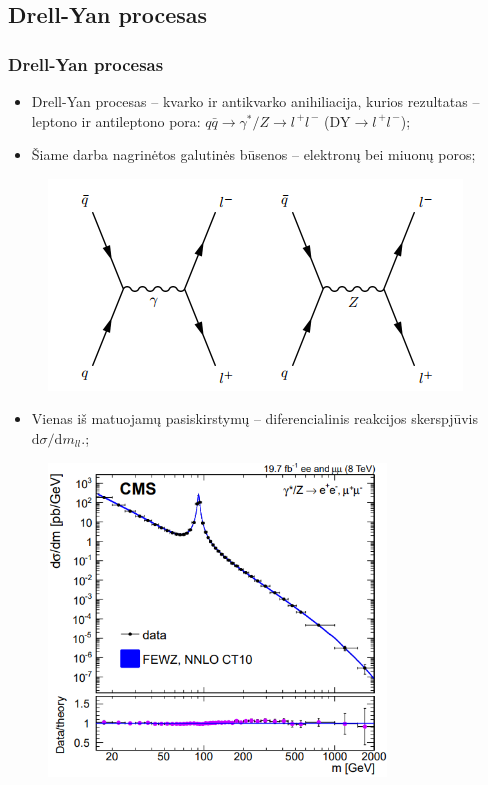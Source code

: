 \documentclass[xcolor=dvipsnames]{beamer}
\begin{document}
\begin{frame}
	\section{Drell-Yan procesas}
	\frametitle{Drell-Yan procesas}
	\begin{itemize}
		\item Drell-Yan procesas -- kvarko ir antikvarko anihiliacija, kurios rezultatas -- leptono ir antileptono pora:
		$\mathit{q}\bar{\mathit{q}}\rightarrow \gamma^{*}/\mathit{Z}\rightarrow \mathit{l^{\, +}\! l^{\, -}}$
		($\mathrm{DY}\!\rightarrow\!\mathit{l^{\, +}\! l^{\, -}}$);
		\item Šiame darba nagrinėtos galutinės būsenos -- elektronų bei miuonų poros;
	\end{itemize}
	\begin{minipage}{0.45\textwidth}
		\begin{figure}[H]
			\includegraphics[width=\textwidth]{DYprocess.PNG}
		\end{figure}
		\begin{itemize}
			\item \small Vienas iš matuojamų pasiskirstymų -- diferencialinis reakcijos skerspjūvis
			$\mathrm{d}\sigma/\mathrm{d}\mathit{m}_{\mathit{ll}}$.;
		\end{itemize}
	\end{minipage}
	\hfill
	\begin{minipage}{0.54\textwidth}
		\vspace{-0.2cm}
		\begin{figure}[H]
			\includegraphics[width=0.8\textwidth]{DYeeCS.PNG}

\end{figure}
\end{minipage}
\end{frame}
\end{document}
